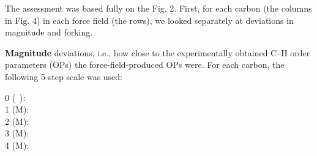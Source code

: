 \documentclass[journal=jacsat,manuscript=article]{achemso}
\begin{document}
The assessment was based fully on the Fig. 2.
%
First, for each carbon (the columns in Fig. 4) in each force field (the rows),
we looked separately at deviations in magnitude and forking.

{\bf Magnitude} deviations, i.e., how close to the experimentally obtained C--H order parameters (OPs)
the force-field-produced OPs were.
%
For each carbon, the following 5-step scale was used:
%
\begin{description}
\item [0 (~):] 
%
\item [1 ({\textsf{\tiny M}}):] 
%
\item [2  ({\textsf{\small M}}):] 
%
\item [3 ({\textsf{\large M}}):] 
%
\item [4 ({\textsf{\Large M}}):] 
\end{description}
\end{document}

